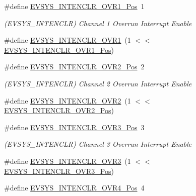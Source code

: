 \begin{DoxyCompactItemize}
\item 
\#define \mbox{\hyperlink{group___s_a_m_d21___e_v_s_y_s_ga0acf1039dffbb284b974ac3701124842}{E\+V\+S\+Y\+S\+\_\+\+I\+N\+T\+E\+N\+C\+L\+R\+\_\+\+O\+V\+R1\+\_\+\+Pos}}~1
\begin{DoxyCompactList}\small\item\em (E\+V\+S\+Y\+S\+\_\+\+I\+N\+T\+E\+N\+C\+LR) Channel 1 Overrun Interrupt Enable \end{DoxyCompactList}\item 
\#define \mbox{\hyperlink{group___s_a_m_d21___e_v_s_y_s_gafa933453bc8ec1c657467141d1d9ebe1}{E\+V\+S\+Y\+S\+\_\+\+I\+N\+T\+E\+N\+C\+L\+R\+\_\+\+O\+V\+R1}}~(1 $<$$<$ \mbox{\hyperlink{group___s_a_m_d21___e_v_s_y_s_ga0acf1039dffbb284b974ac3701124842}{E\+V\+S\+Y\+S\+\_\+\+I\+N\+T\+E\+N\+C\+L\+R\+\_\+\+O\+V\+R1\+\_\+\+Pos}})
\item 
\#define \mbox{\hyperlink{group___s_a_m_d21___e_v_s_y_s_ga44ebcf12fed04a93c6caf4d3c6261210}{E\+V\+S\+Y\+S\+\_\+\+I\+N\+T\+E\+N\+C\+L\+R\+\_\+\+O\+V\+R2\+\_\+\+Pos}}~2
\begin{DoxyCompactList}\small\item\em (E\+V\+S\+Y\+S\+\_\+\+I\+N\+T\+E\+N\+C\+LR) Channel 2 Overrun Interrupt Enable \end{DoxyCompactList}\item 
\#define \mbox{\hyperlink{group___s_a_m_d21___e_v_s_y_s_ga884111ff37e53f0be9eef9467f2053b7}{E\+V\+S\+Y\+S\+\_\+\+I\+N\+T\+E\+N\+C\+L\+R\+\_\+\+O\+V\+R2}}~(1 $<$$<$ \mbox{\hyperlink{group___s_a_m_d21___e_v_s_y_s_ga44ebcf12fed04a93c6caf4d3c6261210}{E\+V\+S\+Y\+S\+\_\+\+I\+N\+T\+E\+N\+C\+L\+R\+\_\+\+O\+V\+R2\+\_\+\+Pos}})
\item 
\#define \mbox{\hyperlink{group___s_a_m_d21___e_v_s_y_s_gaa36c399686fdfdb7118d77edfa7e4343}{E\+V\+S\+Y\+S\+\_\+\+I\+N\+T\+E\+N\+C\+L\+R\+\_\+\+O\+V\+R3\+\_\+\+Pos}}~3
\begin{DoxyCompactList}\small\item\em (E\+V\+S\+Y\+S\+\_\+\+I\+N\+T\+E\+N\+C\+LR) Channel 3 Overrun Interrupt Enable \end{DoxyCompactList}\item 
\#define \mbox{\hyperlink{group___s_a_m_d21___e_v_s_y_s_ga3b8e7cdfd01c6f9c90a598049ea69200}{E\+V\+S\+Y\+S\+\_\+\+I\+N\+T\+E\+N\+C\+L\+R\+\_\+\+O\+V\+R3}}~(1 $<$$<$ \mbox{\hyperlink{group___s_a_m_d21___e_v_s_y_s_gaa36c399686fdfdb7118d77edfa7e4343}{E\+V\+S\+Y\+S\+\_\+\+I\+N\+T\+E\+N\+C\+L\+R\+\_\+\+O\+V\+R3\+\_\+\+Pos}})
\item 
\#define \mbox{\hyperlink{group___s_a_m_d21___e_v_s_y_s_gab04504d70fc1975108adf154d27f95b6}{E\+V\+S\+Y\+S\+\_\+\+I\+N\+T\+E\+N\+C\+L\+R\+\_\+\+O\+V\+R4\+\_\+\+Pos}}~4
$$
\end{DoxyCompactItemize}
